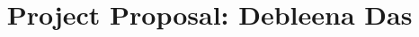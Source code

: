 \documentclass[runningheads,a4paper]{llncs}
\begin{document}
\title{Project Proposal: Debleena Das}
\maketitle
%

%
\end{document}
